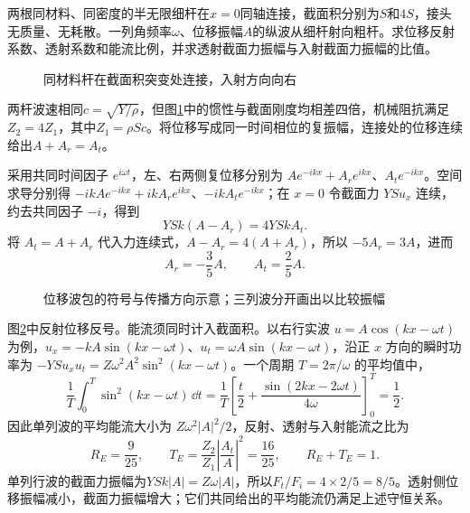 \begin{example}[截面积突变处的纵波反射]\label{ex:sup7-reflection}
两根同材料、同密度的半无限细杆在$x=0$同轴连接，截面积分别为$S$和$4S$，接头无质量、无耗散。一列角频率$\omega$、位移振幅$A$的纵波从细杆射向粗杆。求位移反射系数、透射系数和能流比例，并求透射截面力振幅与入射截面力振幅的比值。
\begin{figure}[H]\centering
{}
\caption{同材料杆在截面积突变处连接，入射方向向右}\label{fig:sup7-reflection-q}
\end{figure}
\end{example}
\begin{solution}
两杆波速相同$c=\sqrt{Y/\rho}$，但图\ref{fig:sup7-reflection-q}中的惯性与截面刚度均相差四倍，机械阻抗满足$Z_2=4Z_1$，其中$Z_1=\rho Sc$。将位移写成同一时间相位的复振幅，连接处的位移连续给出$A+A_r=A_t$。

采用共同时间因子 $e^{i\omega t}$，左、右两侧复位移分别为 $Ae^{-ikx}+A_re^{ikx}$、$A_te^{-ikx}$。空间求导分别得 $-ikAe^{-ikx}+ikA_re^{ikx}$、$-ikA_te^{-ikx}$；在 $x=0$ 令截面力 $YSu_x$ 连续，约去共同因子 $-i$，得到
\[
 YSk(A-A_r)=4YSkA_t.
\]
将 $A_t=A+A_r$ 代入力连续式，$A-A_r=4(A+A_r)$，所以 $-5A_r=3A$，进而
\[
 A_r=-\frac35A,\qquad A_t=\frac25A.
\]
\begin{figure}[H]\centering
{}
\caption{位移波包的符号与传播方向示意；三列波分开画出以比较振幅}\label{fig:sup7-reflection-s}
\end{figure}
图\ref{fig:sup7-reflection-s}中反射位移反号。能流须同时计入截面积。以右行实波 $u=A\cos(kx-\omega t)$ 为例，$u_x=-kA\sin(kx-\omega t)$、$u_t=\omega A\sin(kx-\omega t)$，沿正 $x$ 方向的瞬时功率为 $-YSu_xu_t=Z\omega^2A^2\sin^2(kx-\omega t)$。一个周期 $T=2\pi/\omega$ 的平均值中，
\[
\frac1T\int_0^T\sin^2(kx-\omega t)\,\dd t
=\frac1T\left[\frac t2+\frac{\sin(2kx-2\omega t)}{4\omega}\right]_0^T=\frac12.
\]
因此单列波的平均能流大小为 $Z\omega^2|A|^2/2$，反射、透射与入射能流之比为
\[
 R_E=\frac9{25},\qquad
 T_E=\frac{Z_2}{Z_1}\left|\frac{A_t}A\right|^2=\frac{16}{25},
 \qquad R_E+T_E=1.
\]
单列行波的截面力振幅为$YSk|A|=Z\omega|A|$，所以$F_t/F_i=4\times2/5=8/5$。透射侧位移振幅减小，截面力振幅增大；它们共同给出的平均能流仍满足上述守恒关系。
\end{solution}



